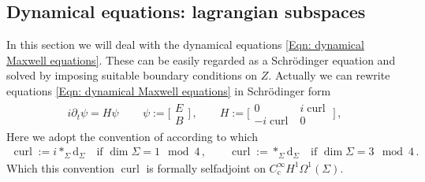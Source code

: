 \subsection{Dynamical equations: lagrangian subspaces}\label{Sec: dynamical equations: boundary triples}
In this section we will deal with the dynamical equations \eqref{Eqn: dynamical Maxwell equations}.
These can be easily regarded as a Schr\"odinger equation and solved by imposing suitable boundary conditions on $Z$.
Actually we can rewrite equations \eqref{Eqn: dynamical Maxwell equations} in Schr\"odinger form
\begin{align}\label{Eqn: dynamical eqns in Schroedinger form}
	i\partial_t\psi=H\psi\,\qquad
	\psi:=\bigg[\begin{matrix}E\\B\end{matrix}\bigg]\,,\qquad
	H:=\bigg[\begin{matrix}0&i\operatorname{curl}\\-i\operatorname{curl}&0\end{matrix}\bigg]\,,
\end{align}
Here we adopt the convention of \cite{Baer-19} according to which
\begin{align}\label{Eqn: curl convention}
	\operatorname{curl}:=i\ast_\Sigma\mathrm{d}_\Sigma\quad\textrm{if }\dim\Sigma=1\mod 4\,,\qquad
	\operatorname{curl}:=\ast_\Sigma\mathrm{d}_\Sigma\quad\textrm{if }\dim\Sigma=3\mod 4\,.
\end{align}
Which this convention $\operatorname{curl}$ is formally selfadjoint on $C^\infty_{\mathrm{c}}H^1\Omega^1(\Sigma)$.

